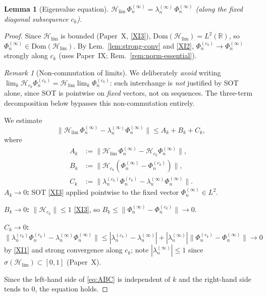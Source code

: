 \documentclass[12pt,a4paper]{amsart}
\newtheorem{lemma}[theorem]{Lemma}
\theoremstyle{definition}
\theoremstyle{remark}
\newtheorem*{remark*}{Remark}
\newcommand{\Hlim}{\mathcal{H}_{\lim}}
\newcommand{\Dom}{\mathrm{Dom}}
\begin{document}
\begin{lemma}[Eigenvalue equation]
\label{lem:eigenvalue-eq}
$\Hlim\,\Phi_n^{(\infty)}
=\lambda_n^{(\infty)}\,\Phi_n^{(\infty)}$
(along the fixed diagonal subsequence $c_k$).
\end{lemma}
\begin{proof}
Since $\Hlim$ is bounded (Paper~X, \eqref{XI3}),
$\Dom(\Hlim)=L^2(\mathbb{R})$, so
$\Phi_n^{(\infty)}\in\Dom(\Hlim)$.
By Lem.~\ref{lem:strong-conv} and \eqref{XI2},
$\Phi_n^{(c_k)}\to\Phi_n^{(\infty)}$ strongly
along $c_k$
(uses Paper~IX; Rem.~\ref{rem:norm-essential}).

\begin{remark*}[Non-commutation of limits]
We deliberately \emph{avoid} writing
$\lim_k\mathcal{H}_{c_k}\Phi_n^{(c_k)}
= \Hlim\lim_k\Phi_n^{(c_k)}$:
such interchange is \emph{not} justified by
SOT alone, since SOT is pointwise on
\emph{fixed} vectors, not on sequences.
The three-term decomposition below bypasses
this non-commutation entirely.
\end{remark*}

We estimate
\begin{equation}\label{eq:ABC}
  \|\Hlim\,\Phi_n^{(\infty)}
  - \lambda_n^{(\infty)}\Phi_n^{(\infty)}\|
  \le A_k + B_k + C_k,
\end{equation}
where
\begin{align*}
  A_k &:= \|\Hlim\,\Phi_n^{(\infty)}
           - \mathcal{H}_{c_k}\Phi_n^{(\infty)}\|,\\
  B_k &:= \|\mathcal{H}_{c_k}
           (\Phi_n^{(\infty)}-\Phi_n^{(c_k)})\|,\\
  C_k &:= \|\lambda_n^{(c_k)}\Phi_n^{(c_k)}
           - \lambda_n^{(\infty)}\Phi_n^{(\infty)}\|.
\end{align*}
\textbf{$A_k\to 0$:}
SOT \eqref{XI3} applied pointwise to the
fixed vector $\Phi_n^{(\infty)}\in L^2$.

\textbf{$B_k\to 0$:}
$\|\mathcal{H}_{c_k}\|\le 1$ \eqref{XI3}, so
$B_k\le\|\Phi_n^{(\infty)}-\Phi_n^{(c_k)}\|\to 0$.

\textbf{$C_k\to 0$:}
$\|\lambda_n^{(c_k)}\Phi_n^{(c_k)}
 - \lambda_n^{(\infty)}\Phi_n^{(\infty)}\|
\le |\lambda_n^{(c_k)}-\lambda_n^{(\infty)}|
 + |\lambda_n^{(\infty)}|
   \|\Phi_n^{(c_k)}-\Phi_n^{(\infty)}\|
\to 0$
by \eqref{XI1} and strong convergence along $c_k$;
note $|\lambda_n^{(\infty)}|\le 1$
since $\sigma(\Hlim)\subset[0,1]$ (Paper~X).

Since the left-hand side of \eqref{eq:ABC}
is independent of $k$ and the right-hand
side tends to $0$, the equation holds.
\end{proof}
\end{document}
